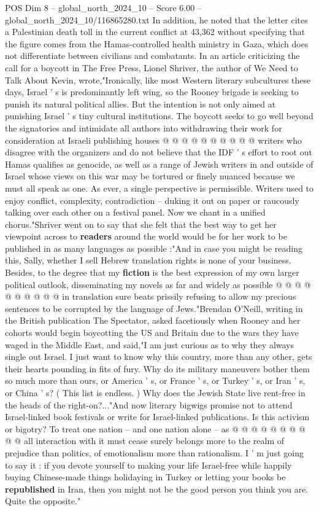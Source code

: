 \begin{textsample}{POS Dim 8 – global\_north\_2024\_10 – Score 6.00 – global\_north\_2024\_10/116865280.txt}
In addition, he noted that the letter cites a Palestinian death toll in the current conflict at 43,362 without specifying that the figure comes from the Hamas-controlled health ministry in Gaza, which does not differentiate between civilians and combatants.
In an article criticizing the call for a boycott in The Free Press, Lionel Shriver, the author of We Need to Talk About Kevin, wrote,"Ironically, like most Western literary subcultures these days, Israel ' s is predominantly left wing, so the Rooney brigade is seeking to punish its natural political allies.
But the intention is not only aimed at punishing Israel ' s tiny cultural institutions.
The boycott seeks to go well beyond the signatories and intimidate all authors into withdrawing their work for consideration at Israeli publishing houses @ @ @ @ @ @ @ @ @ @ writers who disagree with the organizers and do not believe that the IDF ' s effort to root out Hamas qualifies as genocide, as well as a range of Jewish writers in and outside of Israel whose views on this war may be tortured or finely nuanced because we must all speak as one.
As ever, a single perspective is permissible.
Writers used to enjoy conflict, complexity, contradiction -- duking it out on paper or raucously talking over each other on a festival panel.
Now we chant in a unified chorus."Shriver went on to say that she felt that the best way to get her viewpoint across to \textbf{readers} around the world would be for her work to be published in as many languages as possible :"And in case you might be reading this, Sally, whether I sell Hebrew translation rights is none of your business.
Besides, to the degree that my \textbf{fiction} is the best expression of my own larger political outlook, disseminating my novels as far and widely as possible @ @ @ @ @ @ @ @ @ @ in translation sure beats prissily refusing to allow my precious sentences to be corrupted by the language of Jews."Brendan O'Neill, writing in the British publication The Spectator, asked facetiously when Rooney and her cohorts would begin boycotting the US and Britain due to the wars they have waged in the Middle East, and said,"I am just curious as to why they always single out Israel.
I just want to know why this country, more than any other, gets their hearts pounding in fits of fury.
Why do its military maneuvers bother them so much more than ours, or America ' s, or France ' s, or Turkey ' s, or Iran ' s, or China ' s? ( This list is endless. ) Why does the Jewish State live rent-free in the heads of the right-on?..."And now literary bigwigs promise not to attend Israel-linked book festivals or write for Israel-linked publications.
Is this activism or bigotry?
To treat one nation -- and one nation alone -- as @ @ @ @ @ @ @ @ @ @ all interaction with it must cease surely belongs more to the realm of prejudice than politics, of emotionalism more than rationalism.
I ' m just going to say it : if you devote yourself to making your life Israel-free while happily buying Chinese-made things holidaying in Turkey or letting your books be \textbf{republished} in Iran, then you might not be the good person you think you are.
Quite the opposite."


\end{textsample}
